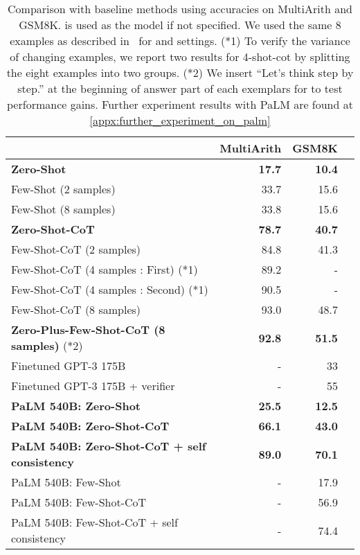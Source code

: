 \begin{table}[t]\centering
\footnotesize
\caption{Comparison with baseline methods using accuracies on MultiArith and GSM8K. \davinci is used as the model if not specified. We used the same 8 examples as described in~\citep{cot_wei} for \theirsf and \theirs settings. (*1) To verify the variance of changing examples, we report two results for 4-shot-cot by splitting the eight examples into two groups. (*2) We insert ``Let's think step by step.'' at the beginning of answer part of each exemplars for \theirs to test performance gains. Further experiment results with PaLM are found at \autoref{appx:further_experiment_on_palm}}
\label{tab:few_shot}

\begin{tabular}{lrrr}\toprule
&MultiArith &GSM8K \\\midrule
\textbf{Zero-Shot} &\textbf{17.7} &\textbf{10.4} \\
Few-Shot (2 samples) &33.7 &15.6 \\
Few-Shot (8 samples) &33.8 &15.6 \\
\midrule
\textbf{Zero-Shot-CoT} &\textbf{78.7} &\textbf{40.7} \\
Few-Shot-CoT (2 samples) &84.8 &41.3 \\
Few-Shot-CoT (4 samples : First) (*1) &89.2 &- \\
Few-Shot-CoT (4 samples : Second) (*1) &90.5 &- \\
Few-Shot-CoT (8 samples) &93.0 &48.7 \\
\textbf{Zero-Plus-Few-Shot-CoT (8 samples)} (*2) &\textbf{92.8} &\textbf{51.5} \\
\midrule
Finetuned GPT-3 175B \citep{cot_wei} &- &33 \\
Finetuned GPT-3 175B + verifier \citep{cot_wei} &- &55 \\
\midrule
\textbf{PaLM 540B: Zero-Shot} & \textbf{25.5} & \textbf{12.5} \\
\textbf{PaLM 540B: Zero-Shot-CoT} & \textbf{66.1} & \textbf{43.0} \\
\textbf{PaLM 540B: Zero-Shot-CoT + self consistency} & \textbf{89.0} & \textbf{70.1} \\
PaLM 540B: Few-Shot \citep{cot_wei} &- &17.9\\
PaLM 540B: Few-Shot-CoT \citep{cot_wei} &- &56.9\\
PaLM 540B: Few-Shot-CoT + self consistency \citep{cot_wei_sc} &- &74.4\\
\bottomrule
\end{tabular}
\captionsetup{skip=5pt}

\end{table}